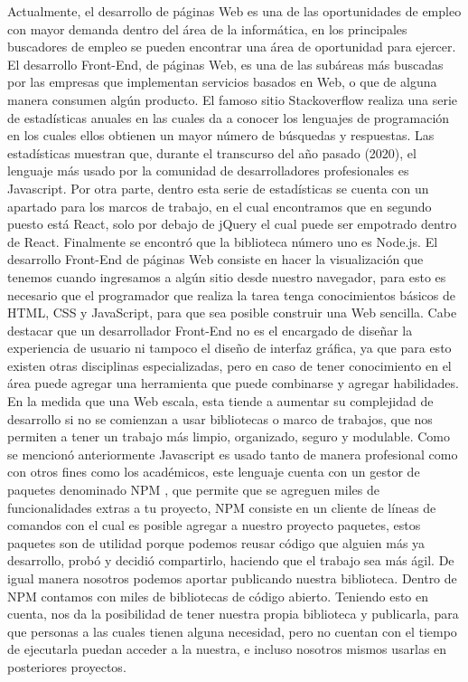 Actualmente, el desarrollo de páginas Web es una de las oportunidades de empleo con mayor demanda dentro del área de la informática, en los principales buscadores de empleo  \cite{work} se pueden encontrar una área de oportunidad para ejercer. El desarrollo Front-End, de páginas Web, es una de las subáreas más buscadas por las empresas que implementan servicios basados en Web, o que de alguna manera consumen algún producto. 
El famoso sitio Stackoverflow  \cite{stackOverflow}realiza una serie de estadísticas anuales en las cuales da a conocer los lenguajes de programación en los cuales ellos obtienen un mayor número de búsquedas y respuestas. Las estadísticas muestran que, durante el transcurso del año pasado (2020), el lenguaje más usado por la comunidad de desarrolladores profesionales es Javascript. 
Por otra parte, dentro esta serie de estadísticas se cuenta con un apartado para los marcos de trabajo, en el cual encontramos que en segundo puesto está React, solo por debajo de jQuery el cual puede ser empotrado dentro de React.  Finalmente se encontró que la biblioteca número uno es Node.js. 
El desarrollo Front-End  \cite{frontEnd}de páginas Web consiste en hacer la visualización que tenemos cuando ingresamos a algún sitio desde nuestro navegador, para esto es necesario que el programador que realiza la tarea tenga conocimientos básicos de HTML, CSS y JavaScript, para que sea posible construir una Web sencilla. Cabe destacar que un desarrollador Front-End no es el encargado de diseñar la experiencia de usuario ni tampoco el diseño de interfaz gráfica, ya que para esto existen otras disciplinas especializadas, pero en caso de tener conocimiento en el área puede agregar una herramienta que puede combinarse y agregar habilidades.
\newline
En la medida que una Web escala, esta tiende a aumentar su complejidad de desarrollo si no se comienzan a usar bibliotecas o marco de trabajos, que nos permiten a tener un trabajo más limpio, organizado, seguro y modulable. 
Como se mencionó anteriormente Javascript es usado tanto de manera profesional como con otros fines como los académicos, este lenguaje cuenta con un gestor de paquetes denominado NPM  \cite{npm},  que permite que se agreguen miles de funcionalidades extras a tu proyecto, NPM consiste en un cliente de líneas de comandos con el cual es posible agregar a nuestro proyecto paquetes, estos paquetes son de utilidad porque podemos reusar código que alguien más ya desarrollo, probó y decidió compartirlo, haciendo que el trabajo sea más ágil.  De igual manera nosotros podemos aportar publicando nuestra biblioteca. Dentro de NPM contamos con miles de bibliotecas de código abierto.  
Teniendo esto en cuenta, nos da la posibilidad de tener nuestra propia biblioteca y publicarla, para que personas a las cuales tienen alguna necesidad, pero no cuentan con el tiempo de ejecutarla puedan acceder a la nuestra, e incluso nosotros mismos usarlas en posteriores proyectos. 

